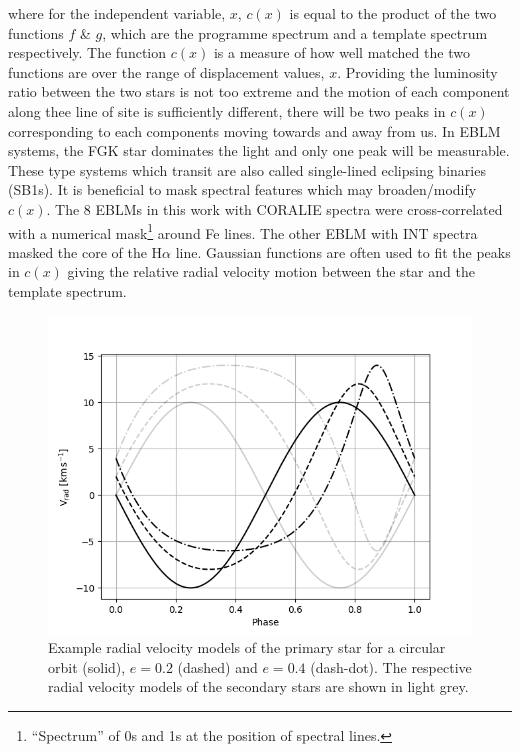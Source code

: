 where for the independent variable, $x$, $c(x)$ is equal to the product of the two functions $f$ \& $g$, which are the programme spectrum and a template spectrum respectively. The function $c(x)$ is a measure of how well matched the two functions are over the range of displacement values, $x$. Providing the luminosity ratio between the two stars is not too extreme and the motion of each component along thee line of site is sufficiently different, there will be two peaks in $c(x)$ corresponding to each components moving towards and away from us. In EBLM systems, the FGK star dominates the light and only one peak will be measurable. These type systems which transit are also called single-lined eclipsing binaries (SB1s). It is beneficial to mask spectral features which may broaden/modify $c(x)$. The 8 EBLMs in this work with CORALIE spectra were cross-correlated with a numerical mask\footnote{``Spectrum'' of 0s and 1s at the position of spectral lines.} around Fe lines. The other EBLM with INT spectra masked the core of the H$\alpha$ line. Gaussian functions are often used to fit the peaks in $c(x)$ giving the relative radial velocity motion between the star and the template spectrum.



\begin{figure}
    \centering
    \includegraphics{4-images/radial_velocity_1.png}
    \caption{Example radial velocity models of the primary star for a circular orbit (solid), $e=0.2$ (dashed) and $e=0.4$ (dash-dot). The respective radial velocity models of the secondary stars are shown in light grey.}
    \label{theory:fig:radial_velocity_1}
\end{figure}

